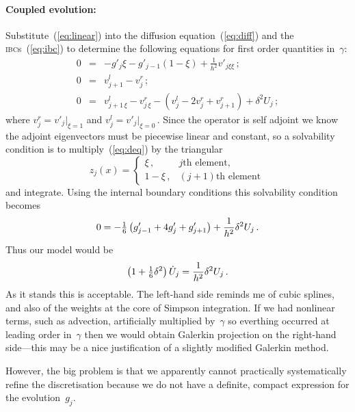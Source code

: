 \documentclass[a5paper]{article}
\newcommand{\ibc}{\textsc{ibc}}
\newcommand{\lj}{|_{\xi=0}}
\newcommand{\rj}{|_{\xi=1}}
\begin{document}
\paragraph{Coupled evolution:}
Substitute~(\ref{eq:linear}) into the diffusion equation~(\ref{eq:diff}) 
and the \ibc{}s~(\ref{eq:ibc}) to determine the following equations 
for first order quantities in~$\gamma$:
\begin{eqnarray}
	0 & = & -g'_j\xi-g'_{j-1}(1-\xi)+\frac{1}{h^2}v'_{j\xi\xi}\,;
	\label{eq:deq}  \\
	0 & = & v^l_{j+1}-v_j^r\,;
	\label{eq:cty'}  \\
	0 & = & v_{j+1\,\xi}^l-v_{j\,\xi}^r
	-\left(v_j^l-2v_j^r+v_{j+1}^r\right)
	+\delta^2U_j\,;
	\label{eq:jump}
\end{eqnarray}
where $v_j^r=v'_j\rj$ and $v_j^l=v'_j\lj$\,.  Since the operator is 
self adjoint we know the adjoint eigenvectors must be piecewise linear 
and constant, so a solvability condition is to multiply~(\ref{eq:deq}) 
by the triangular
\begin{displaymath}
	z_j(x)=\left\{
		\begin{array}{ll}
		\xi\,, & \mbox{$j$th element,}  \\
		1-\xi\,, & \mbox{$(j+1)$th element}\,
	\end{array}\right.
\end{displaymath}
and integrate.  Using the internal boundary conditions this 
solvability condition becomes
\begin{equation}
	0= -{\textstyle\frac{1}{6}}\left(g'_{j-1}+4g'_j+g'_{j+1}\right)
	+\frac{1}{h^2}\delta^2U_j\,.
	\label{eq:queer}
\end{equation}
Thus our model would be
\begin{equation}
	\left(1+{\textstyle\frac{1}{6}}\delta^2\right)\dot U_j=\frac{1}{h^2}\delta^2U_j\,.
	\label{eq:qmod}
\end{equation}
As it stands this is acceptable.
The left-hand side reminds me of cubic splines, and also of the 
weights at the core of Simpson integration.
If we had nonlinear terms, such as advection, artificially multiplied 
by~$\gamma$ so everthing occurred at leading order in~$\gamma$ then we 
would obtain Galerkin projection on the right-hand side---this may be 
a nice justification of a slightly modified Galerkin method.

However, the big problem is that we apparently cannot practically 
systematically refine the discretisation because we do not have a 
definite, compact expression for the evolution~$g_j$.
\end{document}

